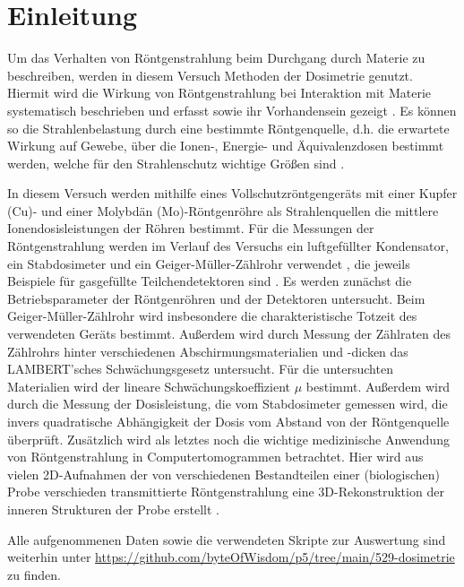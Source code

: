 \chapter{Einleitung}

Um das Verhalten von Röntgenstrahlung beim Durchgang durch Materie zu beschreiben, werden in diesem Versuch Methoden der Dosimetrie genutzt. Hiermit wird die Wirkung von Röntgenstrahlung bei Interaktion mit Materie systematisch beschrieben und erfasst sowie ihr Vorhandensein gezeigt \cite[1]{LDdosimetrie}. Es können so die Strahlenbelastung durch eine bestimmte Röntgenquelle, d.h. die erwartete Wirkung auf Gewebe, über die Ionen-, Energie- und Äquivalenzdosen bestimmt werden, welche für den Strahlenschutz wichtige Größen sind \cite[20]{dosimetriekrieger}.

In diesem Versuch werden mithilfe eines Vollschutzröntgengeräts mit einer Kupfer (Cu)- und einer Molybdän (Mo)-Röntgenröhre als Strahlenquellen die mittlere Ionendosisleistungen der Röhren bestimmt. Für die Messungen der Röntgenstrahlung werden im Verlauf des Versuchs ein luftgefüllter Kondensator, ein Stabdosimeter und ein Geiger-Müller-Zählrohr verwendet \cite[3-5]{529va}, die jeweils Beispiele für gasgefüllte Teilchendetektoren sind \cite[179]{kolanoskiwermerdetektoren}.
Es werden zunächst die Betriebsparameter der Röntgenröhren und der Detektoren untersucht. Beim Geiger-Müller-Zählrohr wird insbesondere die charakteristische Totzeit des verwendeten Geräts bestimmt. Außerdem wird durch Messung der Zählraten des Zählrohrs hinter verschiedenen Abschirmungsmaterialien und -dicken das \uppercase{Lambert}'sches Schwächungsgesetz untersucht. Für die untersuchten Materialien wird der lineare Schwächungskoeffizient $\mu$ bestimmt. Außerdem wird durch die Messung der Dosisleistung, die vom Stabdosimeter gemessen wird, die invers quadratische Abhängigkeit der Dosis vom Abstand von der Röntgenquelle überprüft.
Zusätzlich wird als letztes noch die wichtige medizinische Anwendung von Röntgenstrahlung in Computertomogrammen betrachtet. Hier wird aus vielen 2D-Aufnahmen der von verschiedenen Bestandteilen einer (biologischen) Probe verschieden transmittierte Röntgenstrahlung eine 3D-Rekonstruktion der inneren Strukturen der Probe erstellt \cite[2]{529va}.

Alle aufgenommenen Daten sowie die verwendeten Skripte zur Auswertung sind weiterhin unter \url{https://github.com/byteOfWisdom/p5/tree/main/529-dosimetrie} zu finden.
